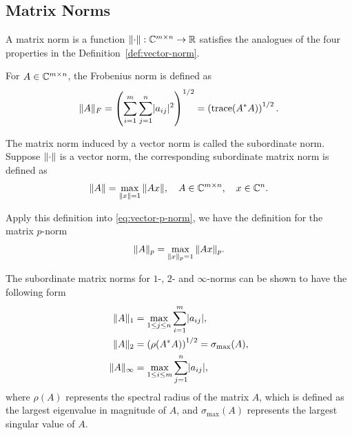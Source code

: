 \documentclass[12pt]{article}
\begin{document}
\subsection{Matrix Norms} \label{subsec:matrix-norms}
\begin{definition}
    A matrix norm is a function $\|{\cdot}\|:\mathbb{C}^{m\times n} \to \mathbb{R}$ satisfies the analogues of the four properties in the Definition~\ref{def:vector-norm}.
\end{definition}

\begin{example}
    For $A\in\mathbb{C}^{m\times n}$, the Frobenius norm is defined as
    \begin{equation}
        \notag
        \|{A}\|_F = \left(\sum_{i = 1}^m \sum_{j = 1}^n \lvert a_{ij}\rvert^2\right)^{1/2} = \left(\mathrm{trace}(A^* A)\right)^{1/2}.
    \end{equation}
\end{example}

\begin{example}
    The matrix norm induced by a vector norm is called the subordinate norm. Suppose $\|{\cdot}\|$ is a vector norm, the corresponding subordinate matrix norm is defined as 
    \begin{equation}
        \notag 
        \|{A}\| = \max_{\|{x}\| = 1} \|{Ax}\|, \quad A \in \mathbb{C}^{m\times n}, \quad x \in \mathbb{C}^n.
    \end{equation}

    Apply this definition into \eqref{eq:vector-p-norm}, we have the definition for the matrix $p$-norm 
    \begin{equation}
        \notag 
        \|{A}\|_p = \max_{\|{x}\|_p = 1} \|{Ax}\|_{p}.
    \end{equation}

    The subordinate matrix norms for $1$-, $2$- and $\infty$-norms can be shown to have the following form 
    \begin{equation}
        \notag 
        \begin{aligned}
            \|{A}\|_1 &= \max_{1\leq j \leq n} \sum_{i = 1}^m \lvert a_{ij}\rvert, \\
            \|{A}\|_2 &= \left(\rho(A^* A)\right)^{1/2} = \sigma_{\max}(A),\\
            \|{A}\|_\infty & = \max_{1 \leq i \leq m} \sum_{j = 1}^n \lvert a_{ij}\rvert,
        \end{aligned}
    \end{equation}
    where $\rho(A)$ represents the spectral radius of the matrix $A$, which is defined as the largest eigenvalue in magnitude of $A$, and $\sigma_{\max}(A)$ represents the largest singular value of $A$.
\end{example}
\end{document}
